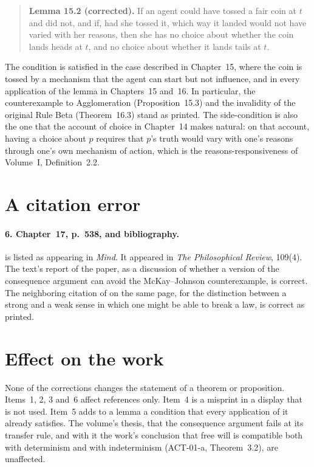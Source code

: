 \documentclass{situationist-preprint}
\begin{document}
\begin{quote}\small
\textbf{Lemma 15.2 (corrected).} If an agent could have tossed a fair coin at $t$ and did not, and if, had she tossed it, which way it landed would not have varied with her reasons, then she has no choice about whether the coin lands heads at $t$, and no choice about whether it lands tails at $t$.
\end{quote}

The condition is satisfied in the case described in Chapter~15, where the coin is tossed by a mechanism that the agent can start but not influence, and in every application of the lemma in Chapters~15 and~16. In particular, the counterexample to Agglomeration (Proposition~15.3) and the invalidity of the original Rule Beta (Theorem~16.3) stand as printed. The side-condition is also the one that the account of choice in Chapter~14 makes natural: on that account, having a choice about $p$ requires that $p$'s truth would vary with one's reasons through one's own mechanism of action, which is the reasons-responsiveness of Volume~I, Definition~2.2.

\section{A citation error}

\paragraph{6. Chapter~17, p.~538, and bibliography.} \citet{Huemer2000} is listed as appearing in \emph{Mind}. It appeared in \emph{The Philosophical Review}, 109(4). The text's report of the paper, as a discussion of whether a version of the consequence argument can avoid the McKay--Johnson counterexample, is correct. The neighboring citation of \citet{Lewis1981} on the same page, for the distinction between a strong and a weak sense in which one might be able to break a law, is correct as printed.

\section{Effect on the work}

None of the corrections changes the statement of a theorem or proposition. Items~1, 2, 3 and~6 affect references only. Item~4 is a misprint in a display that is not used. Item~5 adds to a lemma a condition that every application of it already satisfies. The volume's thesis, that the consequence argument fails at its transfer rule, and with it the work's conclusion that free will is compatible both with determinism and with indeterminism (ACT-01-a, Theorem~3.2), are unaffected.
\end{document}
